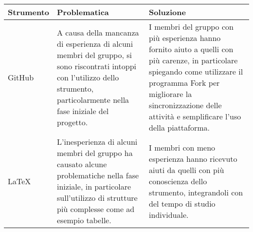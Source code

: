 \begin{center}
    \begin{xltabular}{\linewidth}{|l|X|X|}
    \hline
    \textbf{Strumento} & \textbf{Problematica} & \textbf{Soluzione} \\
    \hline
     GitHub & A causa della mancanza di esperienza di alcuni membri del gruppo, si sono riscontrati intoppi con l'utilizzo dello strumento, particolarmente nella fase iniziale del progetto. & I membri del gruppo con più esperienza hanno fornito aiuto a quelli con più carenze, in particolare spiegando come utilizzare il programma Fork per migliorare la sincronizzazione delle attività e semplificare l'uso della piattaforma. \\
     LaTeX & L'inesperienza di alcuni membri del gruppo ha causato alcune problematiche nella fase iniziale, in particolare sull'utilizzo di strutture più complesse come ad esempio tabelle. & I membri con meno esperienza hanno ricevuto aiuti da quelli con più conoscienza dello strumento, integrandoli con del tempo di studio individuale. \\

    \hline

    \end{xltabular}
\end{center}